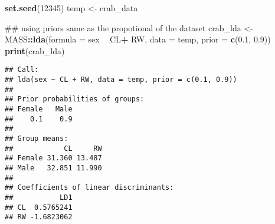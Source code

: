 \documentclass[]{article}
\newenvironment{Shaded}{\begin{snugshade}}{\end{snugshade}}
\newcommand{\KeywordTok}[1]{\textcolor[rgb]{0.13,0.29,0.53}{\textbf{#1}}}
\newcommand{\DataTypeTok}[1]{\textcolor[rgb]{0.13,0.29,0.53}{#1}}
\newcommand{\DecValTok}[1]{\textcolor[rgb]{0.00,0.00,0.81}{#1}}
\newcommand{\FloatTok}[1]{\textcolor[rgb]{0.00,0.00,0.81}{#1}}
\newcommand{\StringTok}[1]{\textcolor[rgb]{0.31,0.60,0.02}{#1}}
\newcommand{\OperatorTok}[1]{\textcolor[rgb]{0.81,0.36,0.00}{\textbf{#1}}}
\newcommand{\NormalTok}[1]{#1}
\begin{document}
\begin{Shaded}
\begin{Highlighting}[]
\KeywordTok{set.seed}\NormalTok{(}\DecValTok{12345}\NormalTok{)}
\NormalTok{temp <-}\StringTok{ }\NormalTok{crab_data}

\NormalTok{## using priors same as the propotional of the dataset}
\NormalTok{crab_lda <-}\StringTok{ }\NormalTok{MASS}\OperatorTok{::}\KeywordTok{lda}\NormalTok{(}\DataTypeTok{formula =}\NormalTok{ sex }\OperatorTok{~}\StringTok{ }\NormalTok{CL}\OperatorTok{+}\StringTok{ }\NormalTok{RW, }\DataTypeTok{data =}\NormalTok{ temp, }\DataTypeTok{prior =} \KeywordTok{c}\NormalTok{(}\FloatTok{0.1}\NormalTok{, }\FloatTok{0.9}\NormalTok{))}
\KeywordTok{print}\NormalTok{(crab_lda)}
\end{Highlighting}
\end{Shaded}

\begin{verbatim}
## Call:
## lda(sex ~ CL + RW, data = temp, prior = c(0.1, 0.9))
## 
## Prior probabilities of groups:
## Female   Male 
##    0.1    0.9 
## 
## Group means:
##            CL     RW
## Female 31.360 13.487
## Male   32.851 11.990
## 
## Coefficients of linear discriminants:
##           LD1
## CL  0.5765241
## RW -1.6823062
\end{verbatim}

\begin{Shaded}
\end{Shaded}
\end{document}
